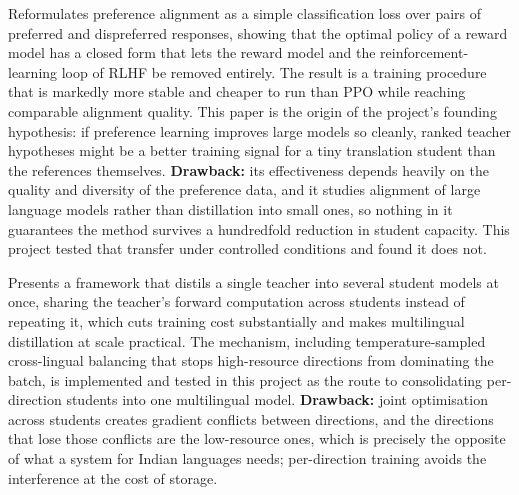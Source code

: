 Reformulates preference alignment as a simple classification loss over
pairs of preferred and dispreferred responses, showing that the optimal policy
of a reward model has a closed form that lets the reward model and the
reinforcement-learning loop of RLHF be removed entirely. The result is a
training procedure that is markedly more stable and cheaper to run than PPO
while reaching comparable alignment quality. This paper is the origin of the
project's founding hypothesis: if preference learning improves large models so
cleanly, ranked teacher hypotheses might be a better training signal for a tiny
translation student than the references themselves.
\textbf{Drawback:} its effectiveness depends heavily on the quality and
diversity of the preference data, and it studies alignment of large language
models rather than distillation into small ones, so nothing in it guarantees
the method survives a hundredfold reduction in student capacity. This project
tested that transfer under controlled conditions and found it does not.

Presents a framework that distils a single teacher into several student
models at once, sharing the teacher's forward computation across students
instead of repeating it, which cuts training cost substantially and makes
multilingual distillation at scale practical. The mechanism, including
temperature-sampled cross-lingual balancing that stops high-resource directions
from dominating the batch, is implemented and tested in this project as the
route to consolidating per-direction students into one multilingual model.
\textbf{Drawback:} joint optimisation across students creates gradient
conflicts between directions, and the directions that lose those conflicts are
the low-resource ones, which is precisely the opposite of what a system for
Indian languages needs; per-direction training avoids the interference at the
cost of storage.

